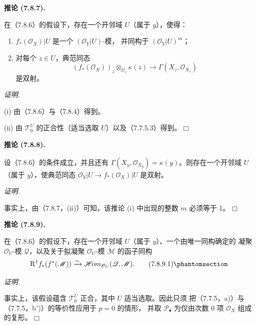 \documentclass[UTF8,fontset=none,11pt,oneside,openany]{ctexbook}
\providecommand{\square}{\mdlgwhtsquare}
\newenvironment{corollary}[1][]{%
  \par\medskip\noindent\textbf{推论 (#1).}\ %
}{\par}
\newenvironment{proof}{%
  \par\smallskip\noindent\textit{证明.}\ %
}{\hfill$\square$\par}
\let\EGAOriginalLabel\label
\renewcommand{\label}[1]{\phantomsection\EGAOriginalLabel{#1}}
\begin{document}
\begin{corollary}[7.8.7]
在（7.8.6）的假设下，存在一个开邻域 $U$（属于 $y$），使得：
\begin{enumerate}
  \item[(i)] $f_*(\mathscr O_X)|U$ 是一个 $(\mathscr O_Y|U)$-模，
    并同构于 $(\mathscr O_Y|U)^m$；
  \item[(ii)] 对每个 $z\in U$，典范同态
    \[
      (f_*(\mathscr O_X))_z
      \otimes_{\mathscr O_z}\kappa(z)
      \longrightarrow
      \Gamma(X_z,\mathscr O_{X_z})
    \]
    是双射。
\end{enumerate}
\end{corollary}

\begin{proof}
(i) 由（7.8.6）与（7.8.4）得到。

(ii) 由 $\mathscr T_0^U$ 的正合性（适当选取 $U$）以及（7.7.5.3）得到。
\end{proof}

\begin{corollary}[7.8.8]
设（7.8.6）的条件成立，并且还有
$\Gamma(X_y,\mathscr O_{X_y})=\kappa(y)$。则存在一个开邻域
$U$（属于 $y$），使典范同态
$\mathscr O_Y|U\to f_*(\mathscr O_X)|U$ 是双射。
\end{corollary}

\begin{proof}
事实上，由（7.8.7，(ii)）可知，该推论 (i) 中出现的整数 $m$ 必须等于 1。
\end{proof}

\begin{corollary}[7.8.9]
在（7.8.6）的假设下，存在一个开邻域 $U$（属于 $y$）、一个由唯一同构确定的
凝聚 $\mathscr O_U$-模 $\mathscr Q$，以及关于拟凝聚 $\mathscr O_U$-模
$\mathscr M$ 的函子同构
\[
  \mathrm R^1f_*(f^*(\mathscr M))
  \xrightarrow{\sim}
  \mathscr{H}\!om_{\mathscr O_U}(\mathscr Q,\mathscr M).
  \tag{7.8.9.1}\label{III.7.8.9.1.fr}
\]
\end{corollary}

\begin{proof}
事实上，该假设蕴含 $\mathscr T_0^U$ 正合，其中 $U$ 适当选取。因此只须
把（7.7.5，a)）与（7.7.5，b$'$)）的等价性应用于 $p=0$ 的情形，
并取 $\mathscr P_\bullet$ 为仅由次数 0 项 $\mathscr O_X$ 组成的复形。
\end{proof}
\end{document}
